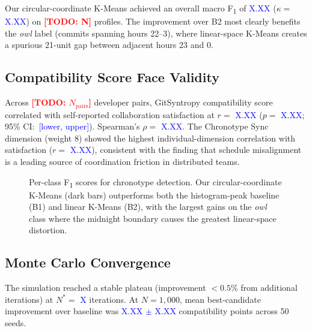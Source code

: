 \documentclass[conference]{IEEEtran}
\newcommand{\TODO}[1]{\textcolor{red}{\textbf{[TODO: #1]}}}
\newcommand{\RESULT}[1]{\textcolor{blue}{#1}}   %
\begin{document}
Our circular-coordinate K-Means achieved an overall macro
F\textsubscript{1} of \RESULT{X.XX} ($\kappa = $ \RESULT{X.XX}) on
\TODO{N} profiles.
The improvement over B2 most clearly benefits the \textit{owl} label
(commits spanning hours 22–3), where linear-space K-Means creates a
spurious 21-unit gap between adjacent hours 23 and 0.

\subsection{Compatibility Score Face Validity}

Across \TODO{$N_{\mathrm{pairs}}$} developer pairs, GitSyntropy
compatibility score correlated with self-reported collaboration
satisfaction at $r = $ \RESULT{X.XX} ($p =$ \RESULT{X.XX}; 95\%
CI:~\RESULT{[lower, upper]}).
Spearman's $\rho = $ \RESULT{X.XX}.
The Chronotype Sync dimension (weight 8) showed the highest
individual-dimension correlation with satisfaction
($r = $ \RESULT{X.XX}), consistent with the finding that schedule
misalignment is a leading source of coordination friction in
distributed teams.

\begin{figure}[t]
  \centering
  \caption{Per-class F\textsubscript{1} scores for chronotype
    detection.
    Our circular-coordinate K-Means (dark bars) outperforms both
    the histogram-peak baseline (B1) and linear K-Means (B2),
    with the largest gains on the \textit{owl} class where the
    midnight boundary causes the greatest linear-space distortion.}
  \label{fig:f1bars}
\end{figure}

\subsection{Monte Carlo Convergence}

The simulation reached a stable plateau (improvement $<0.5\%$ from
additional iterations) at $N^* = $ \RESULT{X} iterations.
At $N{=}1{,}000$, mean best-candidate improvement over baseline was
\RESULT{X.XX $\pm$ X.XX} compatibility points across 50 seeds.
\end{document}
